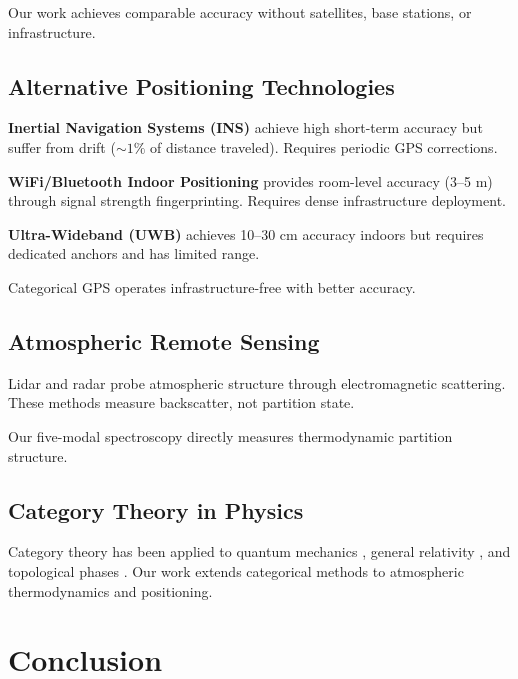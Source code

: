 \documentclass[twocolumn,10pt,a4paper]{article}
\theoremstyle{definition}
\theoremstyle{remark}
\begin{document}
Our work achieves comparable accuracy without satellites, base stations, or infrastructure.

\subsection{Alternative Positioning Technologies}

\textbf{Inertial Navigation Systems (INS)} \cite{titterton2004strapdown} achieve high short-term accuracy but suffer from drift ($\sim 1\%$ of distance traveled). Requires periodic GPS corrections.

\textbf{WiFi/Bluetooth Indoor Positioning} \cite{indoor2017wifi} provides room-level accuracy (3--5 m) through signal strength fingerprinting. Requires dense infrastructure deployment.

\textbf{Ultra-Wideband (UWB)} \cite{uwb2009} achieves 10--30 cm accuracy indoors but requires dedicated anchors and has limited range.

Categorical GPS operates infrastructure-free with better accuracy.

\subsection{Atmospheric Remote Sensing}

Lidar \cite{measures1992laser} and radar \cite{doviak1993doppler} probe atmospheric structure through electromagnetic scattering. These methods measure backscatter, not partition state.

Our five-modal spectroscopy directly measures thermodynamic partition structure.

\subsection{Category Theory in Physics}

Category theory has been applied to quantum mechanics \cite{coecke2010quantum}, general relativity \cite{baez1996higher}, and topological phases \cite{kitaev2006anyons}. Our work extends categorical methods to atmospheric thermodynamics and positioning.

\section{Conclusion}
\label{sec:conclusion}
\end{document}

